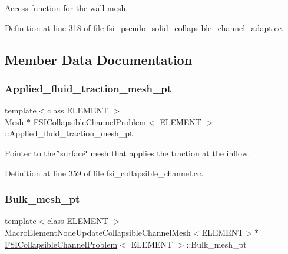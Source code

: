 Access function for the wall mesh. 



Definition at line 318 of file fsi\+\_\+pseudo\+\_\+solid\+\_\+collapsible\+\_\+channel\+\_\+adapt.\+cc.



\subsection{Member Data Documentation}
\mbox{\label{classFSICollapsibleChannelProblem_a0594bd63457b032bcf2a1b6bba534c7e}} 
\subsubsection{\texorpdfstring{Applied\+\_\+fluid\+\_\+traction\+\_\+mesh\+\_\+pt}{Applied\_fluid\_traction\_mesh\_pt}}
{\footnotesize\ttfamily template$<$class E\+L\+E\+M\+E\+NT $>$ \\
Mesh $\ast$ \hyperlink{classFSICollapsibleChannelProblem}{F\+S\+I\+Collapsible\+Channel\+Problem}$<$ E\+L\+E\+M\+E\+NT $>$\+::Applied\+\_\+fluid\+\_\+traction\+\_\+mesh\+\_\+pt\hspace{0.3cm}{\ttfamily [private]}}



Pointer to the \char`\"{}surface\char`\"{} mesh that applies the traction at the inflow. 



Definition at line 359 of file fsi\+\_\+collapsible\+\_\+channel.\+cc.

\mbox{\label{classFSICollapsibleChannelProblem_ab2eb47a9ed4ce8adb3b11ac316644cde}} 
\subsubsection{\texorpdfstring{Bulk\+\_\+mesh\+\_\+pt}{Bulk\_mesh\_pt}\hspace{0.1cm}{\footnotesize\ttfamily [1/6]}}
{\footnotesize\ttfamily template$<$class E\+L\+E\+M\+E\+NT $>$ \\
Macro\+Element\+Node\+Update\+Collapsible\+Channel\+Mesh$<$E\+L\+E\+M\+E\+NT$>$$\ast$ \hyperlink{classFSICollapsibleChannelProblem}{F\+S\+I\+Collapsible\+Channel\+Problem}$<$ E\+L\+E\+M\+E\+NT $>$\+::Bulk\+\_\+mesh\+\_\+pt\hspace{0.3cm}{\ttfamily [private]}}



